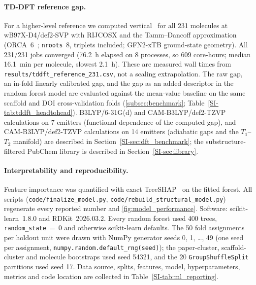 \paragraph{TD-DFT reference gap.}
For a higher-level reference we computed vertical \deltaest\ for all \num{231}
molecules at wB97X-D4/def2-SVP with RIJCOSX and the Tamm--Dancoff approximation
(ORCA~6~\cite{Neese2020}; \texttt{nroots}~8, triplets included; GFN2-xTB
ground-state geometry). All \num{231}/\num{231} jobs converged
(\qty{76.2}{\hour} elapsed on \num{8} processes, so \num{609} core-hours; median
\qty{16.1}{\minute} per molecule, slowest \qty{2.1}{\hour}). These are measured wall times
from \texttt{results/tddft\_reference\_231.csv}, not a scaling extrapolation. The raw
gap, an in-fold linearly calibrated gap, and the gap as an added descriptor in
the random forest model are evaluated against the mean-value baseline on the same
scaffold and DOI cross-validation folds (\cref{subsec:benchmark};
Table~\ref{SI-tab:tddft_headtohead}).
B3LYP/6-31G(d) and CAM-B3LYP/def2-TZVP calculations on \num{7} emitters (functional
dependence of the computed gap), and CAM-B3LYP/def2-TZVP calculations on \num{14}
emitters (adiabatic gaps and the
$T_1$--$T_2$ manifold) are described in Section~\ref{SI-sec:dft_benchmark}; the
substructure-filtered PubChem library is described in Section~\ref{SI-sec:library}.

\paragraph{Interpretability and reproducibility.}
Feature importance was quantified with exact TreeSHAP~\cite{Lundberg2017} on the
fitted forest. All scripts (\texttt{code/finalize\_model.py},
\texttt{code/rebuild\_structural\_model.py}) regenerate every reported number and
\cref{fig:model_performance}.
Software: scikit-learn~1.8.0 and RDKit~2026.03.2. Every random forest used
\num{400} trees, \texttt{random\_state}~=~0 and otherwise scikit-learn defaults.
The \num{50} fold assignments per holdout unit were drawn with NumPy generator
seeds 0, 1, \ldots, 49 (one seed per assignment,
\texttt{numpy.random.default\_rng(seed)}); the paper-cluster, scaffold-cluster
and molecule bootstraps used seed \num{54321}, and the \num{20}
\texttt{GroupShuffleSplit} partitions used seed \num{17}. Data source, splits,
features, model, hyperparameters, metrics and code location are collected in
Table~\ref{SI-tab:ml_reporting}.

